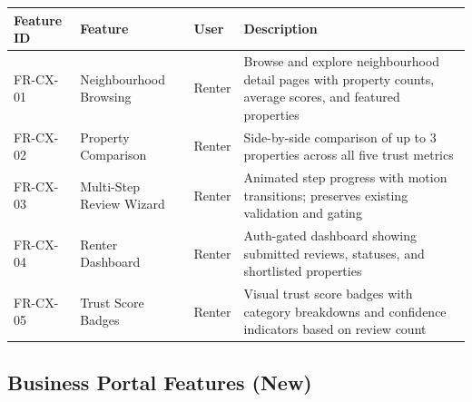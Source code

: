 \documentclass[11pt,letterpaper]{article}
\begin{document}
\begin{longtable}{p{3.5cm} p{4cm} p{2cm} p{4cm}}
\toprule
\textbf{Feature ID} & \textbf{Feature} & \textbf{User} & \textbf{Description} \\
\midrule
\endhead
FR-CX-01 &
Neighbourhood Browsing &
Renter &
Browse and explore neighbourhood detail pages with property counts, average scores, and featured properties \\
\addlinespace
FR-CX-02 &
Property Comparison &
Renter &
Side-by-side comparison of up to 3 properties across all five trust metrics \\
\addlinespace
FR-CX-03 &
Multi-Step Review Wizard &
Renter &
Animated step progress with motion transitions; preserves existing validation and gating \\
\addlinespace
FR-CX-04 &
Renter Dashboard &
Renter &
Auth-gated dashboard showing submitted reviews, statuses, and shortlisted properties \\
\addlinespace
FR-CX-05 &
Trust Score Badges &
Renter &
Visual trust score badges with category breakdowns and confidence indicators based on review count \\
\bottomrule
\end{longtable}

\subsection{Business Portal Features (New)}
\end{document}
